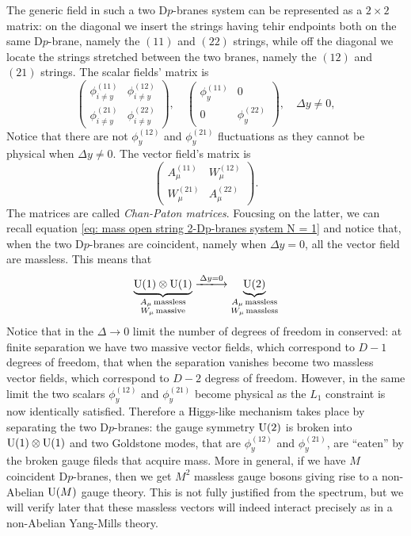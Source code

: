 The generic field in such a two D$p$-branes system can be represented as a $2 \times 2$ matrix: on the diagonal we insert the strings having tehir endpoints both on the same D$p$-brane, namely the $(11)$ and $(22)$ strings, while off the diagonal we locate the strings stretched between the two branes, namely the $(12)$ and $(21)$ strings. The scalar fields' matrix is 
\begin{equation}
    \begin{pmatrix}
        \phi_{i \neq y}^{(11)} & \phi_{i \neq y}^{(12)} \\[1.5ex]
        \phi_{i \neq y}^{(21)} & \phi_{i \neq y}^{(22)}
    \end{pmatrix},\quad 
    \begin{pmatrix}
        \phi_{y}^{(11)} & 0 \\
        0 & \phi_{y}^{(22)}
    \end{pmatrix},\quad \Delta y \neq 0,
\end{equation}
Notice that there are not $\phi_y^{(12)}$ and $\phi_y^{(21)}$ fluctuations as they cannot be physical when $\Delta y \neq 0$. The vector field's matrix is
\begin{equation}
    \begin{pmatrix}
        A_\mu^{(11)} & W_\mu^{(12)} \\
        W_\mu^{(21)} & A_\mu^{(22)}
    \end{pmatrix}.
\end{equation}
The matrices are called \emph{Chan-Paton matrices}. Foucsing on the latter, we can recall equation \eqref{eq: mass open string 2-Dp-branes system N = 1} and notice that, when the two D$p$-branes are coincident, namely when $\Delta y = 0$, all the vector field are massless. This means that 
\begin{equation}
    \underbrace{\group{U}{1} \ot \group{U}{1}}_{\substack{A_\mu\,\rem{massless} \\ W_\mu\,\rem{massive}}} \xlongrightarrow{\Delta y = 0} \underbrace{\group{U}{2}}_{\substack{A_\mu\,\rem{massless} \\ W_\mu\,\rem{massless}}}
\end{equation}
Notice that in the $\Delta \to 0$ limit the number of degrees of freedom in conserved: at finite separation we have two massive vector fields, which correspond to $D - 1$ degrees of freedom, that when the separation vanishes become two massless vector fields, which correspond to $D -2$ degress of freedom. However, in the same limit the two scalars $\phi_y^{(12)}$ and $\phi_y^{(21)}$ become physical as the $L_1$ constraint is now identically satisfied. Therefore a Higgs-like mechanism takes place by separating the two D$p$-branes: the gauge symmetry $\mathrm{U}(2)$ is broken into $\mathrm{U}(1) \otimes \mathrm{U}(1)$ and two Goldstone modes, that are $\phi_y^{(12)}$ and $\phi_y^{(21)}$, are ``eaten'' by the broken gauge fileds that acquire mass. More in general, if we have $M$ coincident D$p$-branes, then we get $M^2$ massless gauge bosons giving rise to a non-Abelian $\mathrm{U}(M)$ gauge theory.  This is not fully justified from the spectrum, but we will verify later that these massless vectors will indeed interact precisely as in a non-Abelian Yang-Mills theory.